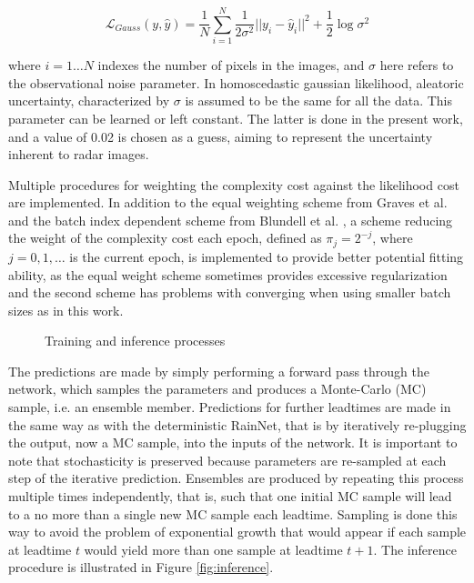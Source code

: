 \begin{equation}
	\mathcal{L}_{Gauss}(y, \hat{y}) = \frac{1}{N} \sum_{i=1}^{N} \frac{1}{2\sigma^2}||y_i - \hat{y}_i||^2 
	+ \frac{1}{2} \log \sigma^2
\end{equation}

where $i = 1 \dots N$ indexes the number of pixels in the images, and $\sigma$ here refers to the observational noise parameter. In homoscedastic gaussian likelihood, aleatoric uncertainty, characterized by $\sigma$ is assumed to be the same for all the data. This parameter can be learned or left constant. The latter is done in the present work, and a value of 0.02 is chosen as a guess, aiming to represent the uncertainty inherent to radar images. 

Multiple procedures for weighting the complexity cost against the likelihood cost are implemented. In addition to the equal weighting scheme from Graves et al. \cite{graves_practical_2011} and the batch index dependent scheme from Blundell et al. \cite{blundell_weight_2015}, a scheme reducing the weight of the complexity cost each epoch, defined as $\pi_j = 2^{-j}$, where $j=0,1,\dots$ is the current epoch, is implemented to provide better potential fitting ability, as the equal weight scheme sometimes provides excessive regularization and the second scheme has problems with converging when using smaller batch sizes as in this work.


\begin{figure}[ht]
	\begin{center}
		\caption{Training and inference processes}
		\label{fig:training_inference_diagram}
	\end{center}
\end{figure}

The predictions are made by simply performing a forward pass through the network, which samples the parameters and produces a Monte-Carlo (MC) sample, i.e. an ensemble member. Predictions for further leadtimes are made in the same way as with the deterministic RainNet, that is by iteratively re-plugging the output, now a MC sample, into the inputs of the network. It is important to note that stochasticity is preserved because parameters are re-sampled at each step of the iterative prediction. Ensembles are produced by repeating this process multiple times independently, that is, such that one initial MC sample will lead to a no more than a single new MC sample each leadtime. Sampling is done this way to avoid the problem of exponential growth that would appear if each sample at leadtime $t$ would yield more than one sample at leadtime $t+1$. The inference procedure is illustrated in Figure \ref{fig:inference}.


